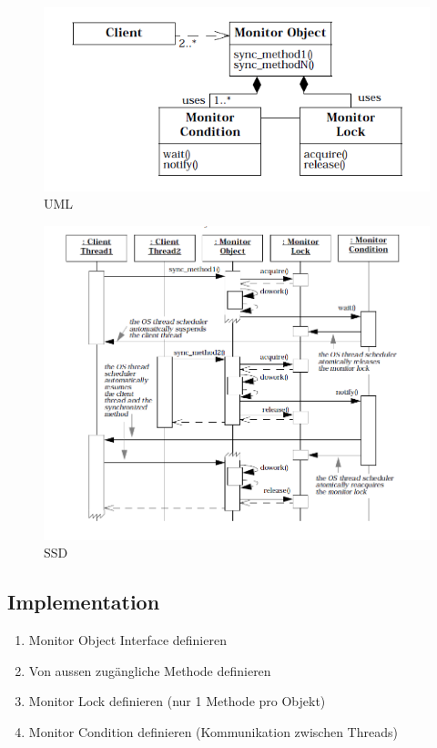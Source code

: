 \begin{figure}[H]
	\centering
	\includegraphics[width=\textwidth]{content/posa2/monitor-object/images/UML.png}
	\caption{UML}
\end{figure}


\begin{figure}[H]
	\centering
	\includegraphics[width=\textwidth]{content/posa2/monitor-object/images/SSD.png}
	\caption{SSD}
\end{figure}


\subsection*{Implementation}

\begin{enumerate}
	\item Monitor Object Interface definieren
	\item Von aussen zugängliche Methode definieren
	\item Monitor Lock definieren (nur 1 Methode pro Objekt)
	\item Monitor Condition definieren (Kommunikation zwischen Threads)
\end{enumerate}



